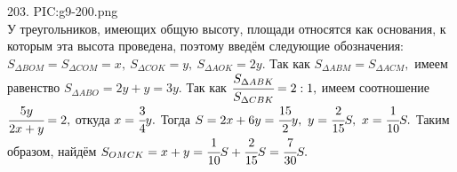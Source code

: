 203. {{PIC:g9-200.png}}\\
У треугольников, имеющих общую высоту, площади относятся как основания, к которым эта высота проведена, поэтому введём следующие обозначения: $S_{\Delta BOM}=S_{\Delta COM}=x,\ S_{\Delta COK}=y,\ S_{\Delta AOK}=2y.$ Так как $S_{\Delta ABM}=S_{\Delta ACM},$ имеем равенство $S_{\Delta ABO}=2y+y=3y.$
Так как $\cfrac{S_{\Delta ABK}}{S_{\Delta CBK}}=2:1,$ имеем соотношение
$\cfrac{5y}{2x+y}=2,$ откуда $x=\cfrac{3}{4}y.$ Тогда $S=2x+6y=\cfrac{15}{2}y,\ y=\cfrac{2}{15}S,\ x=\cfrac{1}{10}S.$ Таким образом, найдём
$S_{OMCK}=x+y=\cfrac{1}{10}S+\cfrac{2}{15}S=\cfrac{7}{30}S.$\newpage\noindent
